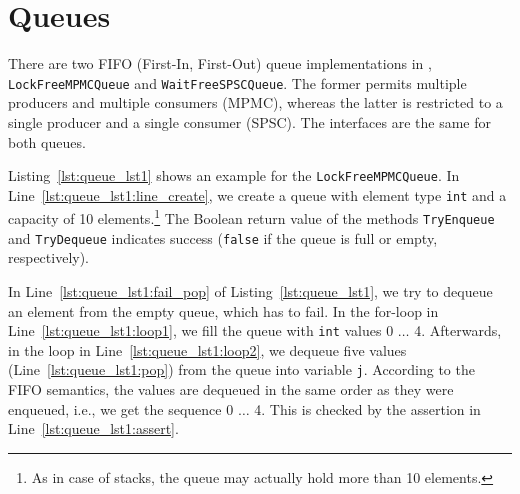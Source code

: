 \section{Queues}
\label{sec:containers_queues}

There are two FIFO (First-In, First-Out) queue implementations in \embb, \lstinline|LockFreeMPMCQueue| and \lstinline|WaitFreeSPSCQueue|. The former permits multiple producers and multiple consumers (MPMC), whereas the latter is restricted to a single producer and a single consumer (SPSC). The interfaces are the same for both queues.

Listing~\ref{lst:queue_lst1} shows an example for the \lstinline|LockFreeMPMCQueue|. In Line~\ref{lst:queue_lst1:line_create}, we create a queue with element type \lstinline|int| and a capacity of 10 elements.\footnote{As in case of stacks, the queue may actually hold more than 10 elements.} The Boolean return value of the methods \lstinline|TryEnqueue| and \lstinline|TryDequeue| indicates success (\lstinline|false| if the queue is full or empty, respectively).



In Line~\ref{lst:queue_lst1:fail_pop} of Listing~\ref{lst:queue_lst1}, we try to dequeue an element from the empty queue, which has to fail. In the for-loop in Line~\ref{lst:queue_lst1:loop1}, we fill the queue with \lstinline|int| values 0 $\ldots$ 4. Afterwards, in the loop in Line~\ref{lst:queue_lst1:loop2}, we dequeue five values (Line~\ref{lst:queue_lst1:pop}) from the queue into variable \lstinline|j|. According to the FIFO semantics, the values are dequeued in the same order as they were enqueued, i.e., we get the sequence 0 $\ldots$ 4. This is checked by the assertion in Line~\ref{lst:queue_lst1:assert}.
